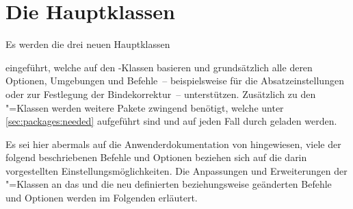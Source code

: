 \chapter[Die Klassen tudscrbook, tudscrreprt und tudscrartcl]{Die Hauptklassen}
\label{sec:mainclasses}
\begin{Declaration*}{}
\begin{Declaration*}{}
\begin{Declaration*}{}
Es werden die drei neuen Hauptklassen
%
\begin{description}
\item {}
\item {}
\item {}
\end{description}
%
eingeführt, welche auf den \KOMAScript-Klassen basieren und grundsätzlich alle
deren Optionen, Umgebungen und Befehle~-- beispielsweise  für 
die Absatzeinstellungen oder  zur Festlegung der Bindekorrektur~-- 
unterstützen. Zusätzlich zu den \KOMAScript"=Klassen werden weitere Pakete 
zwingend benötigt, welche unter \autoref{sec:packages:needed} aufgeführt sind 
und auf jeden Fall durch \TUDScript geladen werden.

Es sei hier abermals auf die Anwenderdokumentation \scrguide von \KOMAScript{} 
hingewiesen, viele der folgend beschriebenen Befehle und Optionen beziehen sich 
auf die darin vorgestellten Einstellungsmöglichkeiten. Die Anpassungen und 
Erweiterungen der \KOMAScript"=Klassen an das \CD und die neu definierten 
beziehungsweise geänderten Befehle und Optionen werden im Folgenden erläutert.
\end{Declaration*}
\end{Declaration*}
\end{Declaration*}

